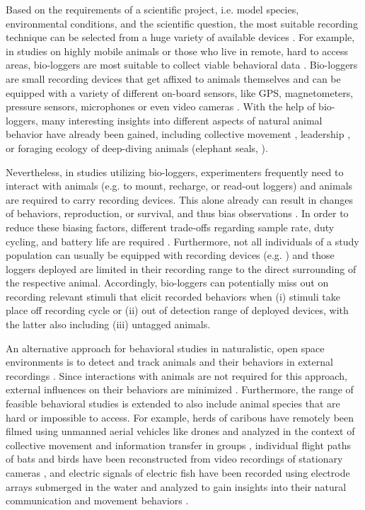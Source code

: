 Based on the requirements of a scientific project, i.e. model species, environmental conditions, and the scientific question, the most suitable recording technique can be selected from a huge variety of available devices \citep{Hughey2018}. For example, in studies on highly mobile animals or those who live in remote, hard to access areas, bio-loggers are most suitable to collect viable behavioral data \citep{Nagy2010, StrandburgPeshkin2017}. Bio-loggers are small recording devices that get affixed to animals themselves and can be equipped with a variety of different on-board sensors, like GPS, magnetometers, pressure sensors, microphones or even video cameras \citep{Hughey2018}. With the help of bio-loggers, many interesting insights into different aspects of natural animal behavior have already been gained, including collective movement \citep{Nagy2010, Strandburg2015}, leadership \citep{Strandburg2018}, or foraging ecology of deep-diving animals (elephant seals, \citealp{Robinson2012}).

Nevertheless, in studies utilizing bio-loggers, experimenters frequently need to interact with animals (e.g. to mount, recharge, or read-out loggers) and animals are required to carry recording devices. This alone already can result in changes of behaviors, reproduction, or survival, and thus bias observations \citep{Saraux2011}. In order to reduce these biasing factors, different trade-offs regarding sample rate, duty cycling, and battery life are required \citep{StrandburgPeshkin2017, Hughey2018}. Furthermore, not all individuals of a study population can usually be equipped with recording devices (e.g. \citealp{StrandburgPeshkin2019}) and those loggers deployed are limited in their recording range to the direct surrounding of the respective animal. Accordingly, bio-loggers can potentially miss out on recording relevant stimuli that elicit recorded behaviors when  (i) stimuli take place off recording cycle or (ii) out of detection range of deployed devices, with the latter also including (iii) untagged animals. 

An alternative approach for behavioral studies in naturalistic, open space environments is to detect and track animals and their behaviors in external recordings \citep{Kuhl2013, Hughey2018}. Since interactions with animals are not required for this approach, external influences on their behaviors are minimized \citep{Saraux2011}. Furthermore, the range of feasible behavioral studies is extended to also include animal species that are hard or impossible to access. For example, herds of caribous have remotely been filmed using unmanned aerial vehicles like drones and analyzed in the context of collective movement and information transfer in groups \citep{Torney2018}, individual flight paths of bats and birds have been reconstructed from video recordings of stationary cameras \citep{Theriault2014}, and electric signals of electric fish have been recorded using electrode arrays submerged in the water and analyzed to gain insights into their natural communication and movement behaviors \citep{Henninger2018, Henninger2020}. 

